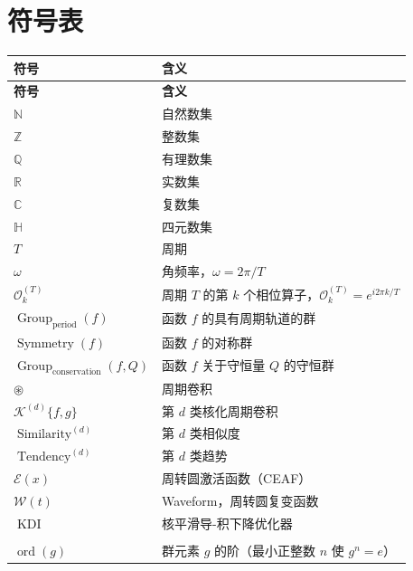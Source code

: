 \listoffigures
\listoftables

\chapter*{符号表}

\begin{longtable}{@{}>{\raggedright\arraybackslash}p{4.4cm}>{\raggedright\arraybackslash}p{9.3cm}@{}}
\toprule
\textbf{符号} & \textbf{含义} \\
\midrule
\endfirsthead

\toprule
\textbf{符号} & \textbf{含义} \\
\midrule
\endhead

\bottomrule
\endlastfoot

$\mathbb{N}$ & 自然数集 \\
$\mathbb{Z}$ & 整数集 \\
$\mathbb{Q}$ & 有理数集 \\
$\mathbb{R}$ & 实数集 \\
$\mathbb{C}$ & 复数集 \\
$\mathbb{H}$ & 四元数集 \\
$T$ & 周期 \\
$\omega$ & 角频率，$\omega = 2\pi/T$ \\
$\mathcal{O}_k^{(T)}$ & 周期 $T$ 的第 $k$ 个相位算子，$\mathcal{O}_k^{(T)} = e^{i2\pi k/T}$ \\
$\operatorname{Group}_{\mathrm{period}}(f)$ & 函数 $f$ 的具有周期轨道的群 \\
$\operatorname{Symmetry}(f)$ & 函数 $f$ 的对称群 \\
$\operatorname{Group}_{\mathrm{conservation}}(f,Q)$ & 函数 $f$ 关于守恒量 $Q$ 的守恒群 \\
$\circledast$ & 周期卷积 \\
$\mathcal{K}^{(d)}\{f,g\}$ & 第 $d$ 类核化周期卷积 \\
$\operatorname{Similarity}^{(d)}$ & 第 $d$ 类相似度 \\
$\operatorname{Tendency}^{(d)}$ & 第 $d$ 类趋势 \\
$\mathcal{E}(x)$ & 周转圆激活函数（CEAF） \\
$\mathcal{W}(t)$ & Waveform，周转圆复变函数 \\
$\operatorname{KDI}$ & 核平滑导-积下降优化器 \\
\midrule
\multicolumn{2}{@{}l}{\textit{群作用与对称}} \\
$\operatorname{ord}(g)$ & 群元素 $g$ 的阶（最小正整数 $n$ 使 $g^n=e$） \\

\end{longtable}
